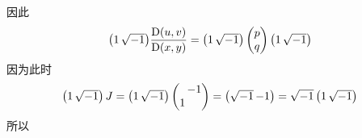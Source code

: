             因此 
            \begin{equation*}
                {\setlength{\arraycolsep}{0.8pt}\begin{pmatrix} 1 & \mi \end{pmatrix}}
                \pD{u,v}{x,y} = 
                {\setlength{\arraycolsep}{0.8pt}\begin{pmatrix} 1 & \mi \end{pmatrix}}
                \begin{pmatrix} p \\ q \end{pmatrix}
                {\setlength{\arraycolsep}{0.8pt}\begin{pmatrix} 1 & \mi \end{pmatrix}}
            \end{equation*}
            因为此时 
            \begin{equation*}
                {\setlength{\arraycolsep}{0.8pt}\begin{pmatrix} 1 & \mi \end{pmatrix}J 
                = \begin{pmatrix} 1 & \mi \end{pmatrix}\begin{pmatrix} & -1 \\ 1 & \end{pmatrix} 
                = \begin{pmatrix} \mi & -1 \end{pmatrix} = \mi\begin{pmatrix} 1 & \mi \end{pmatrix}}
            \end{equation*}
            所以
